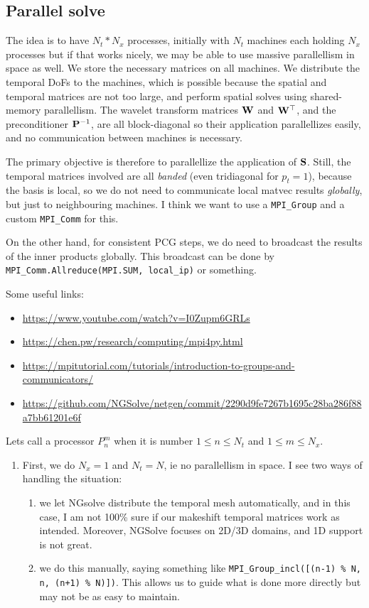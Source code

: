 \documentclass[11pt,a4paper]{amsart}
\theoremstyle{definition}
\begin{document}
\subsection*{Parallel solve}
The idea is to have $N_t * N_x$ processes, initially with $N_t$ machines each
holding $N_x$ processes but if that works nicely, we may be able to use massive
parallellism in space as well. We store the necessary
matrices on all machines. We distribute the temporal DoFs to the machines, which
is possible because the spatial and temporal matrices are not too large, and
perform spatial solves using shared-memory parallellism.  The wavelet transform
matrices ${\bf W}$ and ${\bf W}^\top$, and the preconditioner ${\bf P}^{-1}$, are
all block-diagonal so their application parallellizes easily, and no communication
between machines is necessary.

The primary objective is therefore to parallellize the application of ${\bf S}$. Still,
the temporal matrices involved are all \emph{banded} (even tridiagonal for $p_t = 1$),
because the basis is local, so we do not need to communicate local matvec results
\emph{globally}, but just to neighbouring machines. I think we want to use a \verb`MPI_Group` and a custom \verb`MPI_Comm` for this.

On the other hand, for
consistent PCG steps, we do need to broadcast the results of the inner products
globally.  This broadcast can be done by \verb`MPI_Comm.Allreduce(MPI.SUM, local_ip)` or something.

Some useful links:
\begin{itemize}
  \item \url{https://www.youtube.com/watch?v=I0Zupm6GRLs}
  \item \url{https://chen.pw/research/computing/mpi4py.html}
  \item \url{https://mpitutorial.com/tutorials/introduction-to-groups-and-communicators/}
  \item \url{https://github.com/NGSolve/netgen/commit/2290d9fe7267b1695c28ba286f88a7bb61201e6f}
\end{itemize}

Lets call a processor $P_n^m$ when it is number $1 \leq n \leq N_t$ and $1 \leq m \leq N_x$.
\begin{enumerate}
  \item First, we do $N_x = 1$ and $N_t = N$, ie no parallellism in space. I see
    two ways of handling the situation:
    \begin{enumerate}
      \item we let NGsolve distribute the temporal
      mesh automatically, and in this case, I am not 100\% sure if our makeshift
      temporal matrices work as intended. Moreover, NGSolve focuses on 2D/3D domains,
      and 1D support is not great.
    \item we do this manually, saying something
      like \verb`MPI_Group_incl([(n-1) % N, n, (n+1) % N)])`.
      This allows us to guide what is done more directly but may not be as easy to maintain.
    \end{enumerate}
\end{enumerate}
\end{document}
